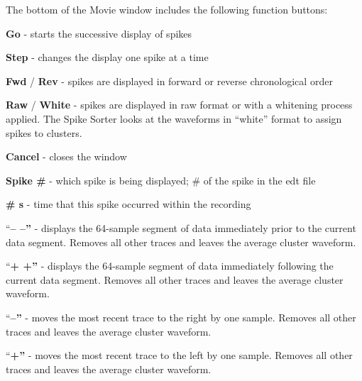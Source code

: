 \documentclass[12pt]{article}
\begin{document}
The bottom of the Movie window includes the following function buttons:
\begin{description}
\item \textbf{\textsf {Go}} - starts the successive display of spikes
\item \textbf{\textsf {Step}} - changes the display one spike at a
  time
\item \textbf{\textsf {Fwd}} / \textbf{\textsf{Rev}} - spikes are
  displayed in forward or reverse chronological order
\item \textbf{\textsf {Raw}} / \textbf{\textsf{White}} - spikes are
  displayed in raw format or with a whitening process applied. The
  Spike Sorter looks at the waveforms in ``white'' format to assign
  spikes to clusters.
\item \textbf{\textsf {Cancel}} - closes the window
\item \textbf{\textsf {Spike \#}} - which spike is being displayed; \#
  of the spike in the edt file
\item \textbf{\textsf {\# s}} - time that this spike occurred within
  the recording
\item ``\textbf{\textsf {-- --}''} - displays the 64-sample segment of
  data immediately prior to the current data segment. Removes all
  other traces and leaves the average cluster waveform.
\item ``\textbf{\textsf {+ +}''} - displays the 64-sample segment of
  data immediately following the current data segment. Removes all
  other traces and leaves the average cluster waveform.
\item ``\textbf{\textsf {--}''} - moves the most recent trace to the
  right by one sample. Removes all other traces and leaves the average
  cluster waveform.
\item ``\textbf{\textsf {+}''} - moves the most recent trace to the
  left by one sample. Removes all other traces and leaves the average
  cluster waveform.


\end{description}
\end{document}
